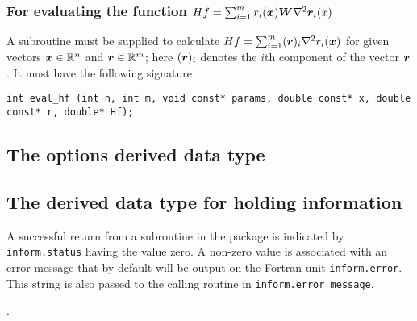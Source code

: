\documentclass{spec}
\begin{document}


\subsubsection{For evaluating the function $Hf = \sum_{i=1}^m r_i({\bm x}) {\bm W}  \nabla^2 {\bm r}_i(x)$}
A subroutine must be supplied to calculate $Hf = \sum_{i=1}^m ({\bm r})_i \nabla^2 r_i({\bm x})$ for given vectors ${\bm x} \in \mathbb{R}^n$ and ${\bm r} \in \mathbb{R}^m$; here \(({\bm r})_i\) denotes the $i$th component of the vector ${\bm r}$.
It must have the following signature

\begin{verbatim}
int eval_hf (int n, int m, void const* params, double const* x, double const* r, double* Hf);
\end{verbatim}






\subsection{The options derived data type}
\label{typeoptions}



\subsection{The derived data type for holding information}
\label{typeinform}




\hslerrors

A successful return from a subroutine in the package is indicated by
{\tt inform.status} having the value zero.
A non-zero value is associated with an error message that by default will
be output on the Fortran unit {\tt inform.error}.  This string is also passed to the
calling routine in {\tt inform.error\_message}.



\hslgeneral

.

\hslmethod
\label{method}



\hslexample




\end{document}
